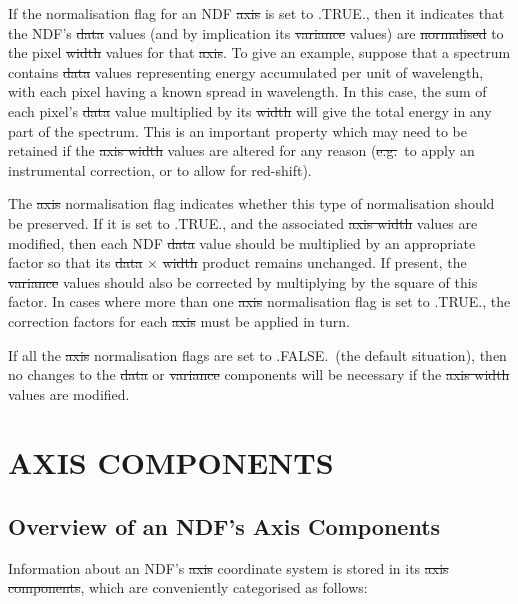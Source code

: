 If the normalisation flag for an NDF \st{axis\/} is set to .TRUE., then it
indicates that the NDF's \st{data} values (and by implication its
\st{variance\/} values) are \st{normalised\/} to the pixel \st{width\/} values 
for that \st{axis\/}. 
To give an example, suppose that a spectrum contains \st{data\/} values
representing energy accumulated per unit of wavelength, with each pixel
having a known spread in wavelength. 
In this case, the sum of each pixel's \st{data\/} value multiplied by its
\st{width\/} will give the total energy in any part of the spectrum. 
This is an important property which may need to be retained if the \st{axis
width\/} values are altered for any reason (\st{e.g.}\ to apply an
instrumental correction, or to allow for red-shift). 

The \st{axis\/} normalisation flag indicates whether this type of
normalisation should be preserved.
If it is set to .TRUE., and the associated \st{axis width\/} values are
modified, then each NDF \st{data\/} value should be multiplied by an
appropriate factor so that its \st{data\/} $\times$ \st{width\/} product
remains unchanged.
If present, the \st{variance\/} values should also be corrected by
multiplying by the square of this factor. 
In cases where more than one \st{axis\/} normalisation flag is set to
.TRUE., the correction factors for each \st{axis\/} must be applied in
turn. 

If all the \st{axis\/} normalisation flags are set to .FALSE.\ (the default
situation), then no changes to the \st{data\/} or \st{variance\/}
components will be necessary if the \st{axis width\/} values are modified. 


\section{\label{ss:axiscomponents}AXIS COMPONENTS}

\subsection{Overview of an NDF's Axis Components}

Information about an NDF's \st{axis\/} coordinate system is stored in its
\st{axis components}, which are conveniently categorised as follows: 

